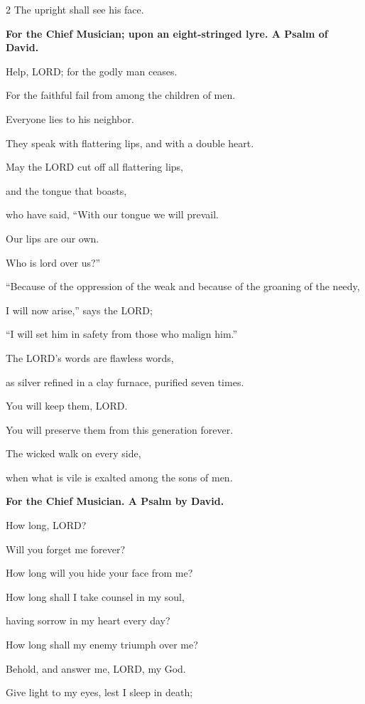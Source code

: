 \begin{multicols}{2}
	The upright shall see his face.
	
	
	\mychapter{}\textbf{For the Chief Musician; upon an eight-stringed lyre. A Psalm of David.}
	
	\myverse*{}Help, LORD; for the godly man ceases.
	
	For the faithful fail from among the children of men.
	
	
	\myverse{}Everyone lies to his neighbor.
	
	They speak with flattering lips, and with a double heart.
	
	
	\myverse{}May the LORD cut off all flattering lips,
	
	and the tongue that boasts,
	
	
	\myverse{}who have said, “With our tongue we will prevail.
	
	Our lips are our own.
	
	Who is lord over us?”
	
	
	\myverse{}“Because of the oppression of the weak and because of the groaning
	of the needy,
	
	I will now arise,” says the LORD;
	
	“I will set him in safety from those who malign him.”
	
	
	\myverse{}The LORD’s words are flawless words,
	
	as silver refined in a clay furnace, purified seven times.
	
	
	\myverse{}You will keep them, LORD.
	
	You will preserve them from this generation forever.
	
	
	\myverse{}The wicked walk on every side,
	
	when what is vile is exalted among the sons of men.
	
	
	\mychapter{}\textbf{For the Chief Musician. A Psalm by David.}
	
	\quad \myverse*{}How long, LORD?
	
	Will you forget me forever?
	
	How long will you hide your face from me?
	
	
	\myverse{}How long shall I take counsel in my soul,
	
	having sorrow in my heart every day?
	
	How long shall my enemy triumph over me?
	
	
	\myverse{}Behold, and answer me, LORD, my God.
	
	Give light to my eyes, lest I sleep in death;
	

\end{multicols}
